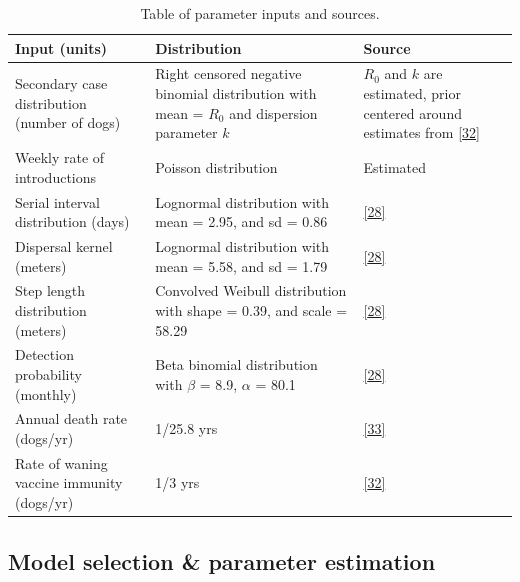 \documentclass[
  oneside]{book}
\begin{document}
\begin{table}

\caption{\label{tab:tbinputs}Table of parameter inputs and sources.}
\centering
\begin{tabu} to 
\toprule
Input (units) & Distribution & Source\\
\midrule
Secondary case distribution (number of dogs) & Right censored negative binomial distribution with mean = $R_{0}$ and dispersion parameter $k$ & $R_{0}$ and $k$ are estimated, prior centered around estimates from \protect\hyperlink{ref-Hampson2009}{{[}32{]}}\\
Weekly rate of introductions & Poisson distribution & Estimated\\
Serial interval distribution (days) & Lognormal distribution with mean = 2.95, and sd = 0.86 & \protect\hyperlink{ref-Mancyinprep}{{[}28{]}}\\
Dispersal kernel (meters) & Lognormal distribution with mean = 5.58, and sd = 1.79 & \protect\hyperlink{ref-Mancyinprep}{{[}28{]}}\\
Step length distribution (meters) & Convolved Weibull distribution with shape = 0.39, and scale = 58.29 & \protect\hyperlink{ref-Mancyinprep}{{[}28{]}}\\
\addlinespace
Detection probability (monthly) & Beta binomial distribution with $\beta$ = 8.9, $\alpha$ = 80.1 & \protect\hyperlink{ref-Mancyinprep}{{[}28{]}}\\
Annual death rate (dogs/yr) & 1/25.8 yrs & \protect\hyperlink{ref-czupryna2016}{{[}33{]}}\\
Rate of waning vaccine immunity (dogs/yr) & 1/3 yrs & \protect\hyperlink{ref-Hampson2009}{{[}32{]}}\\
\bottomrule
\end{tabu}
\end{table}







\hypertarget{model-selection-parameter-estimation}{%
\subsection{Model selection \& parameter estimation}\label{model-selection-parameter-estimation}}
\end{document}
